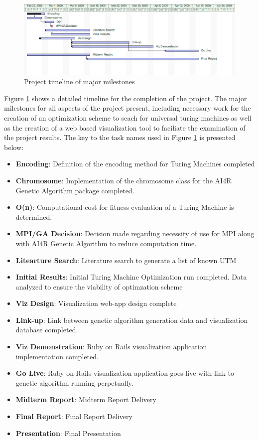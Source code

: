\begin{figure}[htp]
\centering
\includegraphics[width=1\textwidth]{images/gantt.png}
\caption{Project timeline of major milestones}\label{fig:gantt}
\end{figure}
Figure \ref{fig:gantt} shows a detailed timeline for the completion of the project. The major milestones for all aspects of the project present, including necessary work for the creation of an optimization scheme to seach for universal turing machines as well as the creation of a web based visualization tool to faciliate the examination of the project results. The key to the task names used in Figure \ref{fig:gantt} is presented below: 
\begin{itemize}
	\item {\bf Encoding}:	Definition of the encoding method for Turing Machines completed
	\item {\bf Chromosome}: Implementation of the chromosome class for the AI4R Genetic Algorithm package completed.
	\item {\bf O(n)}:	Computational cost for fitness evaluation of a Turing Machine is determined.
	\item {\bf MPI/GA Decision}:	Decision made regarding necessity of use for MPI along with AI4R Genetic Algorithm to reduce computation time.
	\item {\bf Litearture Search}: Literature search to generate a list of known UTM  
	\item {\bf Initial Results}: Initial Turing Machine Optimization run completed. Data analyzed to ensure the viability of optimzation scheme
	\item {\bf Viz Design}: Visualization web-app design complete
	\item {\bf Link-up}: Link between genetic algorithm generation data and visualization database completed.
	\item {\bf Viz Demonstration}: Ruby on Rails visualization application implementation completed.
	\item {\bf Go Live}: Ruby on Rails visualization application goes live with link to genetic algorithm running perpetually.
	\item {\bf Midterm Report}: Midterm Report Delivery
	\item {\bf Final Report}: Final Report Delivery
	\item {\bf Presentation}:	Final Presentation
\end{itemize}
